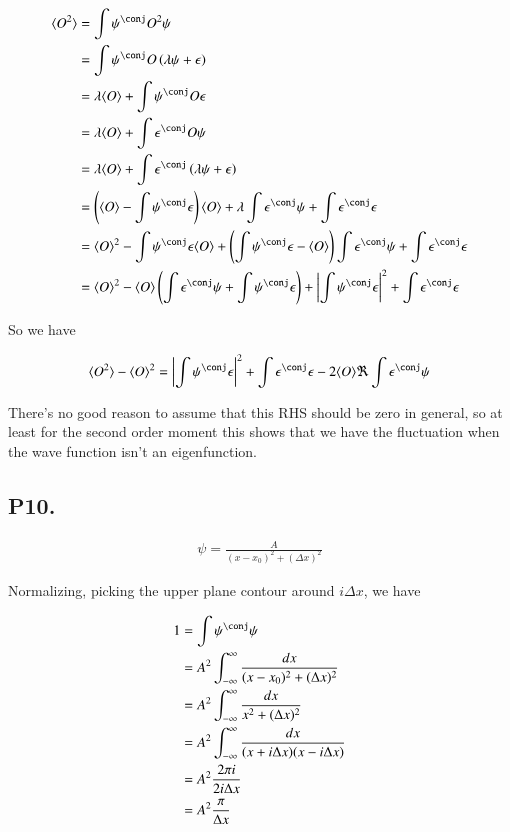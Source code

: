\documentclass{article}
\newcommand{\expectation}[1]{\langle{#1}\rangle}
\begin{document}
\begin{align*}
\expectation{O^2}
&= \int \psi^\conj O^2 \psi \\
&= \int \psi^\conj O \left( \lambda \psi + \epsilon \right) \\
&= \lambda \expectation{O} + \int \psi^\conj O \epsilon \\
&= \lambda \expectation{O} + \int \epsilon^\conj O \psi \\
&= \lambda \expectation{O} + \int \epsilon^\conj \left(\lambda \psi + \epsilon\right) \\
&= \left(\expectation{O} - \int \psi^\conj \epsilon \right)\expectation{O} + 
\lambda \int \epsilon^\conj \psi 
+ \int \epsilon^\conj \epsilon 
\\
&= \expectation{O}^2 - \int \psi^\conj \epsilon \expectation{O} + \left( \int \psi^\conj \epsilon - \expectation{O}\right) \int \epsilon^\conj \psi + \int \epsilon^\conj \epsilon 
\\
&= \expectation{O}^2 
- \expectation{O} \left( \int \epsilon^\conj \psi + \int \psi^\conj \epsilon \right)
+ \Abs{\int \psi^\conj \epsilon}^2
+ \int \epsilon^\conj \epsilon 
\\
\end{align*}

So we have

\begin{align*}
\expectation{O^2} - \expectation{O}^2 
&= 
\Abs{\int \psi^\conj \epsilon}^2 + \int \epsilon^\conj \epsilon - 2 \expectation{O} \Re \int \epsilon^\conj \psi \\
\end{align*}

There's no good reason to assume that this RHS should be zero in general, so at least for the second order moment this shows that we have the fluctuation when the wave
function isn't an eigenfunction.

\subsection{ P10. }

\begin{align*}
\psi = \frac{A}{(x-x_0)^2 + (\Delta x)^2}
\end{align*}

Normalizing, picking the upper plane contour around $i \Delta x$, we have

\begin{align*}
1 &= \int \psi^\conj \psi \\
&= A^2 \int_{-\infty}^\infty \frac{dx}{(x-x_0)^2 + (\Delta x)^2} \\
&= A^2 \int_{-\infty}^\infty \frac{dx}{x^2 + (\Delta x)^2} \\
&= A^2 \int_{-\infty}^\infty \frac{dx}{(x + i\Delta x)(x - i \Delta x)} \\
&= A^2 \frac{2 \pi i }{2 i\Delta x} \\
&= A^2 \frac{\pi}{\Delta x} \\
\end{align*}
\end{document}
